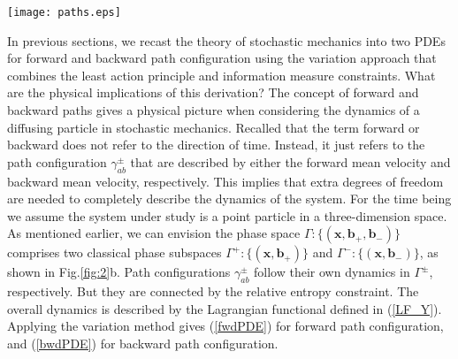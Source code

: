 \documentclass[%
 aip, 
 amsmath,amssymb,amsthm,
 nofootinbib,
 reprint,
]{revtex4-1}
\begin{document}
\begin{figure*}
\begin{center}
\texttt{[image: paths.eps]}
\caption{(a) In classical mechanics, a point particle moves from point $a$ to point $b$ with a path configuration $\gamma_{ab}$ determined by least action principle. (b) In stochastic mechanics, diffusion of a point particle is described with forward and backward path configurations $\gamma^{\pm}_{ab}$. Each path configuration follows its own stochastic differential equation, but connected through the relative entropy constraint. Combing the two PDEs results in the Schr\"{o}dinger equation. (c) Conjecture: By introducing rotational degrees of freedom $\sigma^{\pm}$, there are four path configurations $\gamma^i$ in the phase spaces $\Gamma^i$ $(i=1,2,3,4)$. Can the variation approach developed here lead to the Dirac equation for spin once it is extended into the relativistic framework?}
\label{fig:2}       %
\end{center}
\end{figure*}
In previous sections, we recast the theory of stochastic mechanics into two PDEs for forward and backward path configuration using the variation approach that combines the least action principle and information measure constraints. What are the physical implications of this derivation? 
The concept of forward and backward paths gives a physical picture when considering the dynamics of a diffusing particle in stochastic mechanics. Recalled that the term forward or backward does not refer to the direction of time. Instead, it just refers to the path configuration $\gamma_{ab}^{\pm}$ that are described by either the forward mean velocity and backward mean velocity, respectively. This implies that extra degrees of freedom are needed to completely describe the dynamics of the system. For the time being we assume the system under study is a point particle in a three-dimension space. As mentioned earlier, we can envision the phase space $\Gamma: \{(\mathbf{x}, \mathbf{b}_+, \mathbf{b}_-)\}$ comprises two classical phase subspaces $\Gamma^+: \{(\mathbf{x}, \mathbf{b}_+)\}$ and $\Gamma^-: \{(\mathbf{x}, \mathbf{b}_-)\}$, as shown in Fig.\ref{fig:2}b. Path configurations $\gamma_{ab}^{\pm}$ follow their own dynamics in $\Gamma^{\pm}$, respectively. But they are connected by the relative entropy constraint. The overall dynamics is described by the Lagrangian functional defined in (\ref{LF_Y}). Applying the variation method gives (\ref{fwdPDE}) for forward path configuration, and (\ref{bwdPDE}) for backward path configuration.  
\end{document}
